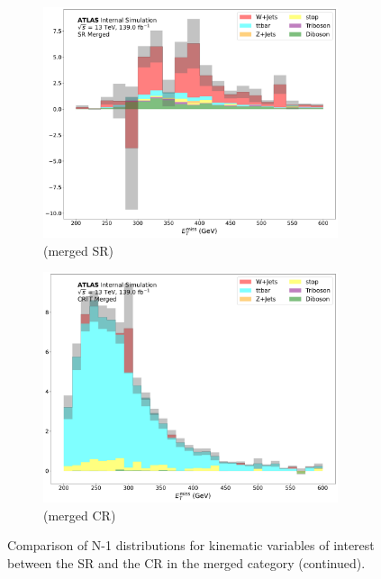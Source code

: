 \begin{figure}[htbp]
   \begin{subfigure}{0.45\textwidth}
     \includegraphics[width = 0.95\textwidth]{Figures/App_SR_CR_distributions/SR1L_Merged/MetTST_met_N_1.pdf}
    \caption{\met (merged SR)}
     \end{subfigure}
    \begin{subfigure}{0.45\textwidth}
     \includegraphics[width = 0.95\textwidth]{Figures/App_SR_CR_distributions/CRTT_Merged/MetTST_met_N_1.pdf}
     \caption{\met (merged \ttbar CR)}
     \end{subfigure}
     \caption{Comparison of N-1 distributions for kinematic variables of interest between the SR and the \ttbar CR in the merged category (continued).}
  \end{figure}



